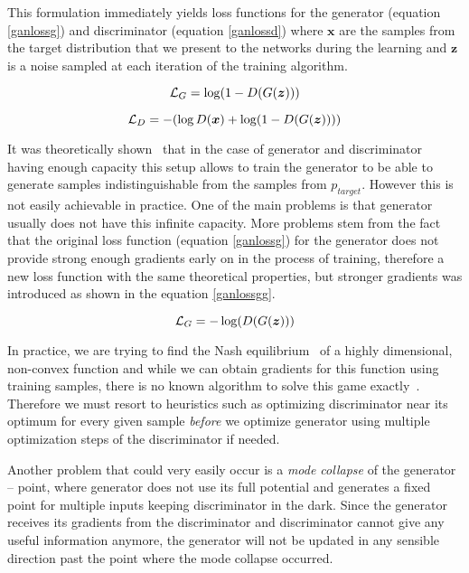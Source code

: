 This formulation immediately yields loss functions for the generator (equation \ref{ganlossg}) and discriminator (equation \ref{ganlossd}) where $\bm{x}$ are the samples from the target distribution that we present to the networks during the learning and $\bm{z}$ is a noise sampled at each iteration of the training algorithm.

\begin{equation}
\mathcal{L}_G = \log(1 - D(G(\bm{z})))
\label{ganlossg}
\end{equation}

\begin{equation}
\mathcal{L}_D = - (\log D(\bm{x}) + \log(1 - D(G(\bm{z}))))
\label{ganlossd}
\end{equation}

It was theoretically shown~\cite{origgan} that in the case of generator and discriminator having enough capacity this setup allows to train the generator to be able to generate samples indistinguishable from the samples from $p_{target}$. However this is not easily achievable in practice. One of the main problems is that generator usually does not have this infinite capacity. More problems stem from the fact that the original loss function (equation \ref{ganlossg}) for the generator does not provide strong enough gradients early on in the process of training, therefore a new loss function with the same theoretical properties, but stronger gradients was introduced as shown in the equation \ref{ganlossgg}.

\begin{equation}
\mathcal{L}_G = -\log(D(G(\bm{z})))
\label{ganlossgg}
\end{equation}

In practice, we are trying to find the Nash equilibrium~\cite{nash} of a highly dimensional, non-convex function and while we can obtain gradients for this function using training samples, there is no known algorithm to solve this game exactly~\cite{improvedgan}. Therefore we must resort to heuristics such as optimizing discriminator near its optimum for every given sample {\em before} we optimize generator using multiple optimization steps of the discriminator if needed.

Another problem that could very easily occur is a {\em mode collapse} of the generator -- point, where generator does not use its full potential and generates a fixed point for multiple inputs keeping discriminator in the dark. Since the generator receives its gradients from the discriminator and discriminator cannot give any useful information anymore, the generator will not be updated in any sensible direction past the point where the mode collapse occurred.

